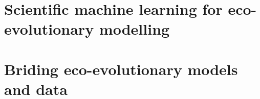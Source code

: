 \documentclass[%
    paper=A4,               %
    twoside=true,           %
    openright,              %
    parskip=half,           %
    chapterprefix=true,     %
    11pt,                   %
    headings=normal,        %
    listof=totoc,           %
    titlepage=on,           %
    captions=tableabove,    %
    chapterprefix=false,    %
    appendixprefix=false,    %
    draft=false,            %
]{scrreprt}%
\begin{document}
\label{part:I}
\begin{refsection}
\end{refsection}

\begin{subappendices}
    \begin{refsection}
    \end{refsection}
\end{subappendices}

\part{Scientific machine learning for eco-evolutionary modelling}
\label{part:II}
\begin{refsection}
    
\end{refsection}

\begin{refsection}
    
\end{refsection}

\begin{refsection}
    
\end{refsection}

\begin{refsection}
    
\end{refsection}

\begin{subappendices}
    \begin{refsection}
    \end{refsection}
\end{subappendices}

\part{Briding eco-evolutionary models and data}
\label{part:III}


  

\cleardoublepage
\end{document}
